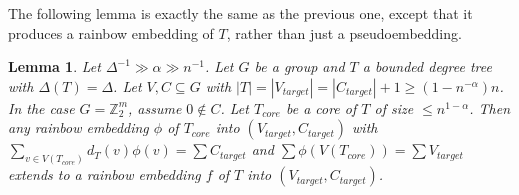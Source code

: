 \documentclass[a4paper,11pt,hidelinks]{amsart}
\newtheorem{lemma}[theorem]{Lemma}
\theoremstyle{definition}
\newcommand{\id}{{0}}%
\begin{document}
The following lemma is exactly the same as the previous one, except that it produces a rainbow embedding of $T$, rather than just a pseudoembedding.
\begin{lemma}\label{Lemma_embed_tree_prescribed_core}
Let $\Delta^{-1}\gg \alpha\gg n^{-1}$.
Let $G$ be a group and $T$ a bounded degree tree with $\Delta(T)=\Delta$. Let $V,C\subseteq G$ with $|T|=|V_{target}|=|C_{target}|+1\geq (1-n^{-\alpha})n$. In the case $G=\mathbb{Z}_2^m$, assume $\id \not\in C$. Let $T_{core}$ be a core of $T$ of size $\leq n^{1-\alpha}$. Then any rainbow embedding $\phi$  of $T_{core}$ into $(V_{target}, C_{target})$ with $\sum_{v\in V(T_{core})}d_T(v)\phi(v)=\sum C_{target}$ and $\sum \phi(V(T_{core}))=\sum V_{target}$ extends to a rainbow embedding $f$ of $T$ into $(V_{target}, C_{target})$.
\end{lemma} 
\end{document}
